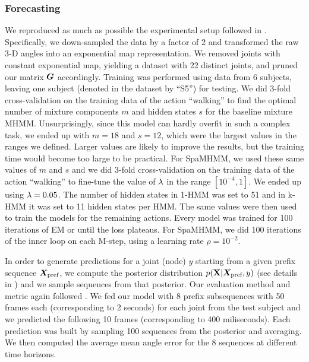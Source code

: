 \subsubsection{Forecasting}

We reproduced as much as possible the experimental setup followed in \citet{Fragkiadaki2015}. Specifically, we down-sampled the data by a factor of 2 and transformed the raw 3-D angles into an exponential map representation. We removed joints with constant exponential map, yielding a dataset with 22 distinct joints, and pruned our matrix ${\bm{G}}$ accordingly. Training was performed using data from 6 subjects, leaving one subject (denoted in the dataset by ``S5'') for testing. We did 3-fold cross-validation on the training data of the action ``walking'' to find the optimal number of mixture components $m$ and hidden states $s$ for the baseline mixture MHMM. Unsurprisingly, since this model can hardly overfit in such a complex task, we ended up with $m=18$ and $s=12$, which were the largest values in the ranges we defined. Larger values are likely to improve the results, but the training time would become too large to be practical. For SpaMHMM, we used these same values of $m$ and $s$ and we did 3-fold cross-validation on the training data of the action ``walking'' to fine-tune the value of $\lambda$ in the range $[10^{-4}, 1]$. We ended up using $\lambda=0.05$. The number of hidden states in 1-HMM was set to 51 and in k-HMM it was set to 11 hidden states per HMM. The same values were then used to train the models for the remaining actions. Every model was trained for 100 iterations of EM  or until the loss plateaus. For SpaMHMM, we did 100 iterations of the inner loop on each M-step, using a learning rate $\rho=10^{-2}$.

In order to generate predictions for a joint (node) $y$ starting from a given prefix sequence ${\bm{X}}_{\text{pref}}$, we compute the posterior distribution $p({\mathbf{X}} | {\bm{X}}_{\text{pref}}, y)$ (see details in ) and we sample sequences from that posterior. Our evaluation method and metric again followed \citet{Fragkiadaki2015}. We fed our model with 8 prefix subsequences with 50 frames each (corresponding to 2 seconds) for each joint from the test subject and we predicted the following 10 frames (corresponding to 400 miliseconds). Each prediction was built by sampling 100 sequences from the posterior and averaging. We then computed the average mean angle error for the 8 sequences at different time horizons.

